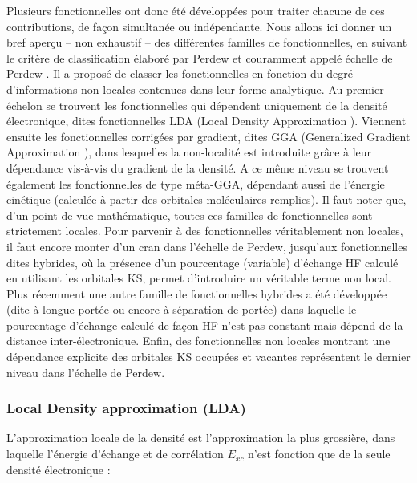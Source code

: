 	Plusieurs fonctionnelles ont donc été développées pour traiter chacune de ces contributions, de façon simultanée ou indépendante. Nous allons ici donner un bref aperçu -- non exhaustif -- des différentes familles de fonctionnelles, en suivant le critère de classification élaboré par Perdew et couramment appelé \og échelle de Perdew \fg{}. Il a proposé de classer les fonctionnelles en fonction du degré d’informations non locales contenues dans leur forme analytique. Au premier échelon se trouvent les fonctionnelles qui dépendent uniquement de la densité électronique, dites fonctionnelles LDA (\og Local Density Approximation \fg{}). Viennent ensuite les fonctionnelles corrigées par gradient, dites GGA (\og Generalized Gradient Approximation \fg{}), dans lesquelles la non-localité est introduite grâce à leur dépendance vis-à-vis du gradient de la densité. A ce même niveau se trouvent également les fonctionnelles de type méta-GGA, dépendant aussi de l’énergie cinétique (calculée à partir des orbitales moléculaires remplies). Il faut noter que, d’un point de vue mathématique, toutes ces familles de fonctionnelles sont strictement locales. Pour parvenir à des fonctionnelles véritablement non locales, il faut encore monter d’un cran dans l’échelle de Perdew, jusqu’aux fonctionnelles dites hybrides, où la présence d’un pourcentage (variable) d’échange HF calculé en utilisant les orbitales KS, permet d’introduire un véritable terme non local. Plus récemment une autre famille de fonctionnelles hybrides a été développée (dite à longue portée ou encore à séparation de portée) dans laquelle le pourcentage d’échange calculé de façon HF n’est pas constant mais dépend de la distance inter-électronique. Enfin, des fonctionnelles non locales montrant une dépendance explicite des orbitales KS occupées et vacantes représentent le dernier niveau dans l’échelle de Perdew.
	
	\subsubsection{Local Density approximation (LDA)}\label{lda}
	
	L’approximation locale de la densité est l’approximation la plus grossière, dans laquelle l’énergie d’échange et de corrélation $E_{xc}$ n’est fonction que de la seule densité électronique :
	
